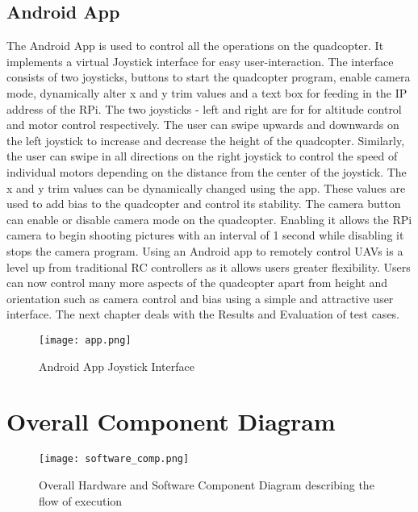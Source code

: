\subsection{Android App}
The Android App is used to control all the operations on the quadcopter. It implements a virtual Joystick interface for easy user-interaction.
The interface consists of two joysticks, buttons to start the quadcopter program, enable camera mode, dynamically alter x and y trim values and a text box for feeding in the IP address of the RPi.
\newline
\newline
The two joysticks - left and right are for for altitude control and motor control respectively. The user can swipe upwards and downwards on the left joystick to increase and decrease the height of the quadcopter.  Similarly, the user can swipe in all directions on the right joystick to control the speed of individual motors depending on the distance from the center of the joystick. 
\newline
\newline
The x and y trim values can be dynamically changed using the app. These values are used to add bias to the quadcopter and control its stability. 
The camera button can enable or disable camera mode on the quadcopter. Enabling it allows the RPi camera to begin shooting pictures with an interval of 1 second while disabling it stops the camera program.
\newline
\newline
Using an Android app to remotely control UAVs is a level up from traditional RC controllers as it allows users greater flexibility. Users can now control many more aspects of the quadcopter apart from height and orientation such as camera control and bias using a simple and attractive user interface.
\newline
The next chapter deals with the Results and Evaluation of test cases.
\begin{figure}[H]
  \centering
  \texttt{[image: app.png]}
  \caption{Android App Joystick Interface}
  \label{app} 
\end{figure}

\section{Overall Component Diagram}
\begin{figure}[H]
  \centering
  \texttt{[image: software\_comp.png]}
  \caption{Overall Hardware and Software Component Diagram describing the flow of execution}
  \label{Software Flow}	
\end{figure}

